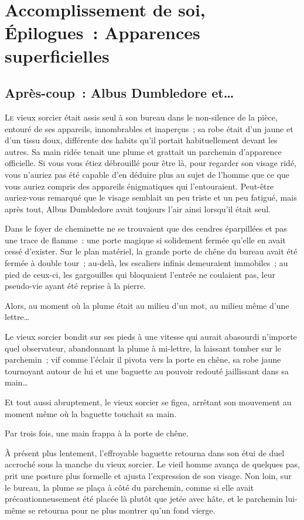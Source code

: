 \chapter{Accomplissement de soi, Épilogues~: Apparences superficielles}

\section{Après-coup~: Albus Dumbledore et…}

\lettrine{L}{e} vieux sorcier était assis seul à son bureau dans le non-silence de la pièce, entouré de ses appareils, innombrables et inaperçus~; sa robe était d'un jaune et d'un tissu doux, différente des habits qu'il portait habituellement devant les autres.
Sa main ridée tenait une plume et grattait un parchemin d'apparence officielle.
Si vous vous étiez débrouillé pour être là, pour regarder son visage ridé, vous n'auriez pas été capable d'en déduire plus au sujet de l'homme que ce que vous auriez compris des appareils énigmatiques qui l'entouraient.
Peut-être auriez-vous remarqué que le visage semblait un peu triste et un peu fatigué, mais après tout, Albus Dumbledore avait toujours l'air ainsi lorsqu'il était seul.

Dans le foyer de cheminette ne se trouvaient que des cendres éparpillées et pas une trace de flamme~: une porte magique si solidement fermée qu'elle en avait cessé d'exister.
Sur le plan matériel, la grande porte de chêne du bureau avait été fermée à double tour~; au-delà, les escaliers infinis demeuraient immobiles~; au pied de ceux-ci, les gargouilles qui bloquaient l'entrée ne coulaient pas, leur pseudo-vie ayant été reprise à la pierre.

Alors, au moment où la plume était au milieu d'un mot, au milieu même d'une lettre…

Le vieux sorcier bondit sur ses pieds à une vitesse qui aurait abasourdi n'importe quel observateur, abandonnant la plume à mi-lettre, la laissant tomber sur le parchemin~; vif comme l'éclair il pivota vers la porte en chêne, sa robe jaune tournoyant autour de lui et une baguette au pouvoir redouté jaillissant dans sa main…

Et tout aussi abruptement, le vieux sorcier se figea, arrêtant son mouvement au moment même où la baguette touchait sa main.

Par trois fois, une main frappa à la porte de chêne.

À présent plus lentement, l'effroyable baguette retourna dans son étui de duel accroché sous la manche du vieux sorcier.
Le vieil homme avança de quelques pas, prit une posture plus formelle et ajusta l'expression de son visage.
Non loin, sur le bureau, la plume se plaça à côté du parchemin, comme si elle avait précautionneusement été placée là plutôt que jetée avec hâte, et le parchemin lui-même se retourna pour ne plus montrer qu'un fond vierge.

